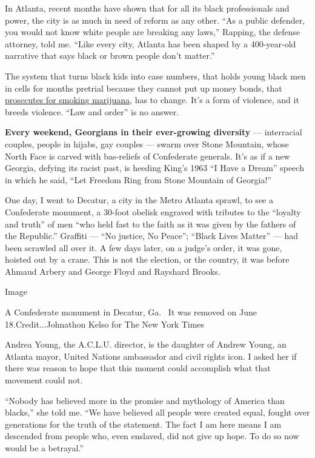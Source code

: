 In Atlanta, recent months have shown that for all its black
professionals and power, the city is as much in need of reform as any
other. ``As a public defender, you would not know white people are
breaking any laws,'' Rapping, the defense attorney, told me. ``Like
every city, Atlanta has been shaped by a 400-year-old narrative that
says black or brown people don't matter.''

The system that turns black kids into case numbers, that holds young
black men in cells for months pretrial because they cannot put up money
bonds, that
\href{https://www.aclu.org/report/tale-two-countries-racially-targeted-arrests-era-marijuana-reform}{prosecutes
for smoking marijuana}, has to change. It's a form of violence, and it
breeds violence. ``Law and order'' is no answer.

\textbf{Every weekend, Georgians in their ever-growing diversity} ---
interracial couples, people in hijabs, gay couples --- swarm over Stone
Mountain, whose North Face is carved with bas-reliefs of Confederate
generals. It's as if a new Georgia, defying its racist past, is heeding
King's 1963 ``I Have a Dream'' speech in which he said, ``Let Freedom
Ring from Stone Mountain of Georgia!''

One day, I went to Decatur, a city in the Metro Atlanta sprawl, to see a
Confederate monument, a 30-foot obelisk engraved with tributes to the
``loyalty and truth'' of men ``who held fast to the faith as it was
given by the fathers of the Republic.'' Graffiti --- ``No justice, No
Peace''; ``Black Lives Matter'' --- had been scrawled all over it. A few
days later, on a judge's order, it was gone, hoisted out by a crane.
This is not the election, or the country, it was before Ahmaud Arbery
and George Floyd and Rayshard Brooks.

Image

A Confederate monument in Decatur, Ga.~ It was removed on June
18.Credit...Johnathon Kelso for The New York Times

Andrea Young, the A.C.L.U. director, is the daughter of Andrew Young, an
Atlanta mayor, United Nations ambassador and civil rights icon. I asked
her if there was reason to hope that this moment could accomplish what
that movement could not.

``Nobody has believed more in the promise and mythology of America than
blacks,'' she told me. ``We have believed all people were created equal,
fought over generations for the truth of the statement. The fact I am
here means I am descended from people who, even enslaved, did not give
up hope. To do so now would be a betrayal.''

